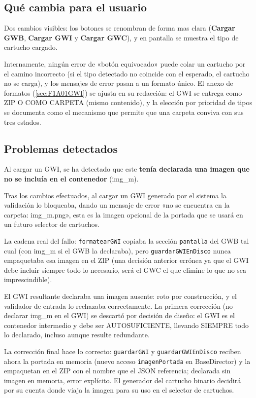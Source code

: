 \subsection{Qué cambia para el usuario}
\label{sec:F5I9Usuario}

Dos cambios visibles: los botones se
renombran de forma mas clara (\textbf{Cargar GWB}, 
\textbf{Cargar GWI} y \textbf{Cargar GWC}), y en pantalla se
muestra el tipo de cartucho cargado. 

Internamente, ningún error de
«botón equivocado» puede colar un cartucho por el camino incorrecto
(si el tipo detectado no coincide con el esperado, el cartucho no se
carga), y los mensajes de error pasan a un formato único. El anexo
de formatos (\ref{sec:F1A01GWI}) se ajusta en su redacción: el GWI se
entrega como ZIP O COMO CARPETA (mismo contenido), y la elección por
prioridad de tipos se documenta como el mecanismo que permite que
una carpeta conviva con sus tres estados.

\subsection{Problemas detectados}
\label{sec:F5I9Problemas}

Al cargar un GWI, se ha detectado que este \textbf{tenía declarada una imagen que no se incluía en el contenedor} (img\_m). 

Tras los cambios efectuados, al cargar un GWI generado por el sistema la
validación lo bloqueaba, dando un mensaje de error «no se encuentra en la carpeta:
img\_m.png», esta es la imagen opcional de la portada que se usará en un futuro selector de cartuchos. 

La cadena real del fallo:
\texttt{formatearGWI} copiaba la sección \texttt{pantalla} del GWB tal
cual (con img\_m si el GWB la declaraba), pero \texttt{guardarGWIEnDisco} 
nunca empaquetaba esa imagen en el ZIP (una decisión anterior errónea ya 
que el GWI debe incluir siempre todo lo necesario, será el GWC el que 
elimine lo que no sea imprescindible). 

El GWI resultante declaraba una imagen ausente: roto por construcción, y
el validador de entrada lo rechazaba correctamente. La primera
corrección (no declarar img\_m en el GWI) se descartó por decisión de
diseño: el GWI es el contenedor intermedio y debe ser AUTOSUFICIENTE,
llevando SIEMPRE todo lo declarado, incluso aunque resulte redundante.

La corrección final hace lo correcto: \texttt{guardarGWI} y
\texttt{guardarGWIEnDisco} reciben ahora la portada en memoria (nuevo
acceso \texttt{imagenPortada} en BaseDirector) y la empaquetan en el
ZIP con el nombre que el JSON referencia; declarada sin imagen en
memoria, error explícito. El generador del cartucho binario decidirá 
por su cuenta donde viaja la imagen para su uso en el selector de cartuchos.